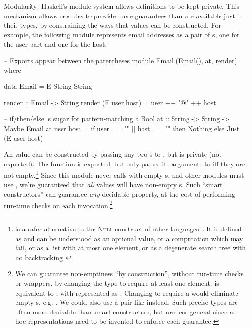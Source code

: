 \begin{description}
\item{Modularity}: Haskell's module system allows definitions to be kept
  private. This mechanism allows modules to provide more guarantees than are
  available just in their types, by constraining the ways that values can be
  constructed. For example, the following module represents email addresses as a
  pair of s, one for the user part and one for the host:

  \begin{haskell}
-- Exports appear between the parentheses
module Email (Email(), at, render) where

data Email = E String String

render :: Email -> String
render (E user host) = user ++ "@" ++ host

-- if/then/else is sugar for pattern-matching a Bool
at :: String -> String -> Maybe Email
at user host = if user == "" || host == ""
                  then Nothing
                  else Just (E user host)
  \end{haskell}

  An  value can be constructed by passing any two s to
  , but  is private (not exported). The  function is
  exported, but only passes its arguments to  iff they are not empty.\footnote{ is a
    safer alternative to the \textsc{Null} construct of other
    languages~\cite{hoare2009null}. It is defined as
     and can be understood as an optional
    value, or a computation which may fail, or as a list with at most one
    element, or as a degenerate search tree with no
    backtracking~\cite{wadler1985replace}} Since this module never calls 
  with empty s, and other modules must use , we're guaranteed
  that \emph{all}  values will have non-empty s. Such
  ``smart constructors'' can guarantee \emph{any} decidable property, at the
  cost of performing run-time checks on each invocation.\footnote{We can
    guarantee non-emptiness ``by construction'', without run-time checks or
     wrappers, by changing the type to require at least one element.
     is equivalent to , with  represented as
    . Changing  to require a  would eliminate empty
    s, e.g. . We
    could also use a pair like  instead.
    Such precise types are often more desirable than smart constructors, but are
    less general since ad-hoc representations need to be invented to enforce
    each guarantee.}

\end{description}

